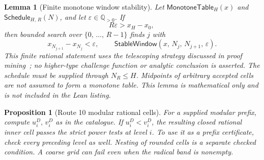 \documentclass[11pt,reqno]{amsart}
\newcommand{\Q}{\mathbb Q}
\theoremstyle{blueplain}
\newtheorem{lemma}{Lemma}[section]
\newtheorem{proposition}{Proposition}[section]
\newcounter{type}
\newcounter{asser}
\providecommand{\comma}{\allowbreak,\,}
\numberwithin{equation}{section}
\begin{document}
\begin{lemma}[Finite monotone window stability]\label{fin:lem:finite-stability}
Let \(\textsf{MonotoneTable}_H(x)\) and
\(\textsf{Schedule}_{H\comma R}(N)\), and let \(\varepsilon\in\Q_{>0}\).
If
\[
R\varepsilon>x_H-x_0\comma
\]
then bounded search over \(\{0\comma\ldots\comma R-1\}\) finds \(j\) with
\[
x_{N_{j+1}}-x_{N_j}<\varepsilon\comma\qquad
\textsf{StableWindow}(x\comma N_j\comma N_{j+1}\comma\varepsilon).
\]
This finite rational statement uses the telescoping strategy discussed
in proof mining~\cite{AvigadGerhardyTowsner2010}; no higher-type challenge
function or analytic conclusion is asserted. The schedule must be supplied
through \(N_R\le H\). Midpoints of arbitrary accepted cells are not
assumed to form a monotone table. This lemma is mathematical only and is
not included in the Lean listing.
\end{lemma}



\begin{proposition}[Route 10 modular rational cells]\label{prop:mod-cell}
For a supplied modular prefix, compute \(u_i^D\comma v_i^D\) as in the
catalogue. If \(u_i^D<v_i^D\), the resulting closed rational inner cell
passes the strict power tests at level \(i\). To use it as a prefix
certificate, check every preceding level as well. Nesting of rounded
cells is a separate checked condition. A coarse grid can fail even
when the radical band is nonempty.
\end{proposition}
\end{document}
